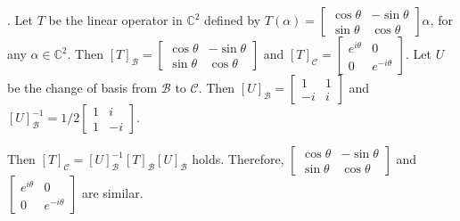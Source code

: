 \documentclass[8pt]{beamer}
\newcommand{\mbb}[1]{\mathbb{#1}}
\newcommand{\mc}[1]{\mathcal{#1}}
\begin{document}
\begin{frame}{.}
    Let $T$ be the linear operator in $\mbb{C}^2$ defined by $T(\alpha) = \begin{bmatrix}
        \cos \theta & - \sin \theta \\ \sin \theta & \cos \theta
    \end{bmatrix} \alpha$, for any $\alpha \in \mbb{C}^2$.
    Then $[T]_{\mc{B}} = \begin{bmatrix}
        \cos \theta & - \sin \theta \\ \sin \theta & \cos \theta
    \end{bmatrix}$ and
    $[T]_{\mc{C}} = \begin{bmatrix}
       e^{i \theta} & 0 \\ 0 & e^{-i \theta}
    \end{bmatrix}$.
    Let $U$ be the change of basis from $\mc{B}$ to $\mc{C}$. Then $[U]_{\mc{B}} = \begin{bmatrix}
     1 & 1 \\ -i & i
    \end{bmatrix}$ and $[U]_{\mc{B}}^{-1} = 1/2 \begin{bmatrix}
        1 & i \\ 1 &-i
    \end{bmatrix}$.

    Then $[T]_{\mc{C}} = [U]_{\mc{B}}^{-1}[T]_{\mc{B}}[U]_{\mc{B}}$ holds.
    Therefore, $\begin{bmatrix}
    \cos \theta & - \sin \theta \\ \sin \theta & \cos \theta
    \end{bmatrix}$ and $\begin{bmatrix}
        e^{i \theta} & 0 \\ 0 & e^{-i \theta}
    \end{bmatrix}$ are similar.
\end{frame}
\end{document}
